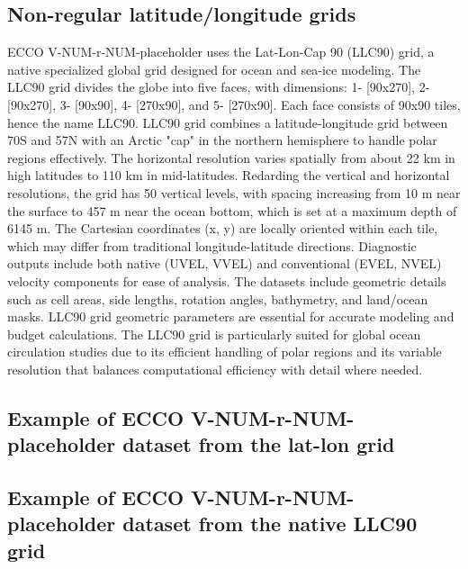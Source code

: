 \subsection*{Non-regular latitude/longitude grids}
\par ECCO V-NUM-r-NUM-placeholder uses the Lat-Lon-Cap 90 (LLC90) grid, a native specialized global grid designed for ocean and sea-ice modeling. The LLC90 grid divides the globe into five faces, with dimensions: 1- [90x270], 2- [90x270], 3- [90x90], 4- [270x90], and 5- [270x90]. Each face consists of 90x90 tiles, hence the name LLC90. LLC90 grid combines a latitude-longitude grid between 70\textdegree S and 57\textdegree N with an Arctic "cap" in the northern hemisphere to handle polar regions effectively. The horizontal resolution varies spatially from about 22 km in high latitudes to 110 km in mid-latitudes. Redarding the vertical and horizontal resolutions, the grid has 50 vertical levels, with spacing increasing from 10 m near the surface to 457 m near the ocean bottom, which is set at a maximum depth of 6145 m. The Cartesian coordinates (x, y) are locally oriented within each tile, which may differ from traditional longitude-latitude directions. Diagnostic outputs include both native (UVEL, VVEL) and conventional (EVEL, NVEL) velocity components for ease of analysis. The datasets include geometric details such as cell areas, side lengths, rotation angles, bathymetry, and land/ocean masks. LLC90 grid geometric parameters are essential for accurate modeling and budget calculations. The LLC90 grid is particularly suited for global ocean circulation studies due to its efficient handling of polar regions and its variable resolution that balances computational efficiency with detail where needed.

\pagebreak
\subsection{Example of ECCO V-NUM-r-NUM-placeholder dataset from the lat-lon grid}

\pagebreak
\subsection{Example of ECCO V-NUM-r-NUM-placeholder dataset from the native LLC90 grid}

%

